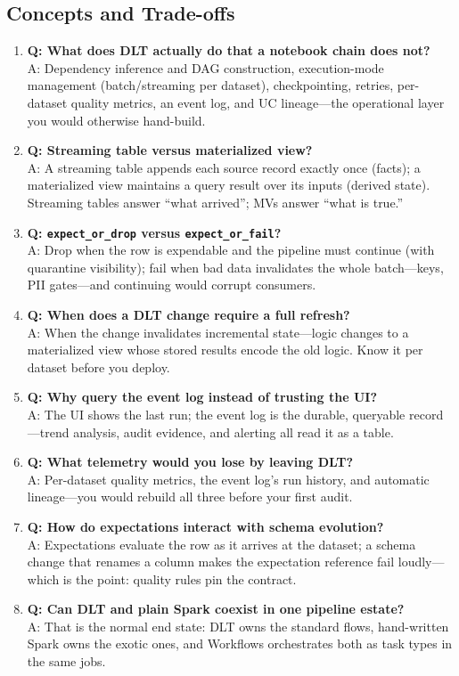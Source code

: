 \subsection{Concepts and Trade-offs}
\begin{enumerate}
    \item \textbf{Q: What does DLT actually do that a notebook chain does not?}\\
    A: Dependency inference and DAG construction, execution-mode management (batch/streaming per dataset), checkpointing, retries, per-dataset quality metrics, an event log, and UC lineage---the operational layer you would otherwise hand-build.
    \item \textbf{Q: Streaming table versus materialized view?}\\
    A: A streaming table appends each source record exactly once (facts); a materialized view maintains a query result over its inputs (derived state). Streaming tables answer ``what arrived''; MVs answer ``what is true.''
    \item \textbf{Q: \texttt{expect\_or\_drop} versus \texttt{expect\_or\_fail}?}\\
    A: Drop when the row is expendable and the pipeline must continue (with quarantine visibility); fail when bad data invalidates the whole batch---keys, PII gates---and continuing would corrupt consumers.
    \item \textbf{Q: When does a DLT change require a full refresh?}\\
    A: When the change invalidates incremental state---logic changes to a materialized view whose stored results encode the old logic. Know it per dataset before you deploy.
    \item \textbf{Q: Why query the event log instead of trusting the UI?}\\
    A: The UI shows the last run; the event log is the durable, queryable record---trend analysis, audit evidence, and alerting all read it as a table.
    \item \textbf{Q: What telemetry would you lose by leaving DLT?}\\
    A: Per-dataset quality metrics, the event log's run history, and automatic lineage---you would rebuild all three before your first audit.
    \item \textbf{Q: How do expectations interact with schema evolution?}\\
    A: Expectations evaluate the row as it arrives at the dataset; a schema change that renames a column makes the expectation reference fail loudly---which is the point: quality rules pin the contract.
    \item \textbf{Q: Can DLT and plain Spark coexist in one pipeline estate?}\\
    A: That is the normal end state: DLT owns the standard flows, hand-written Spark owns the exotic ones, and Workflows orchestrates both as task types in the same jobs.
\end{enumerate}

